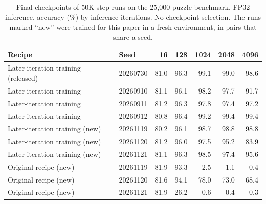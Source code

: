 \begin{table}[t]
\centering
\small
\caption{Final checkpoints of 50K-step runs on the 25,000-puzzle benchmark, FP32 inference, accuracy (\%) by inference iterations. No checkpoint selection. The runs marked ``new'' were trained for this paper in a fresh environment, in pairs that share a seed.}
\label{tab:late}
\begin{tabular}{@{}llrrrrr@{}}
\toprule
Recipe & Seed & 16 & 128 & 1024 & 2048 & 4096 \\
\midrule
Later-iteration training (released) & 20260730 & 81.0 & 96.3 & 99.1 & 99.0 & 98.6 \\
Later-iteration training & 20260910 & 81.1 & 96.1 & 98.2 & 97.7 & 91.7 \\
Later-iteration training & 20260911 & 81.2 & 96.3 & 97.8 & 97.4 & 97.2 \\
Later-iteration training & 20260912 & 80.8 & 96.4 & 99.2 & 99.4 & 99.4 \\
\midrule
Later-iteration training (new) & 20261119 & 80.2 & 96.1 & 98.7 & 98.8 & 98.8 \\
Later-iteration training (new) & 20261120 & 81.2 & 96.0 & 97.5 & 95.2 & 83.9 \\
Later-iteration training (new) & 20261121 & 81.1 & 96.3 & 98.5 & 97.4 & 95.6 \\
\midrule
Original recipe (new) & 20261119 & 81.9 & 93.3 & 2.5 & 1.1 & 0.4 \\
Original recipe (new) & 20261120 & 81.6 & 94.1 & 78.0 & 73.0 & 68.4 \\
Original recipe (new) & 20261121 & 81.9 & 26.2 & 0.6 & 0.4 & 0.3 \\
\bottomrule
\end{tabular}
\end{table}%
